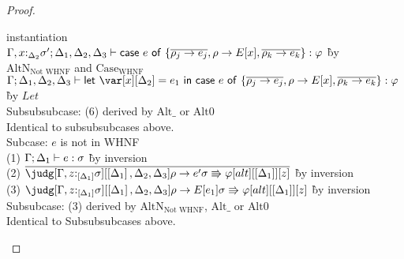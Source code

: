\begin{proof}
\begin{tabbing}
       instantiation\\
         $\Gamma,x{:}_{\Delta_2}\sigma'; \Delta_1,\Delta_2,\Delta_3 \vdash \mathsf{case}~e~\mathsf{of}~\{\overline{\rho_j\to e_j}, \rho \to
  E[x], \overline{\rho_k\to e_k}\} : \varphi$ \` by $\textrm{AltN}_{\textrm{Not
           WHNF}}$ and
       $\textrm{Case}_\textrm{WHNF}$\\
         $\G ; \D_1 , \D_2 , \D_3 \vdash \llet{\x[\D_2] = e_1}{\ccase{e}{\{\overline{\rho_j\to e_j}, \rho \to
           E[x], \overline{\rho_k\to e_k}\}}} : \vp$ \` by
       $\mathit{Let}$\\
       Subsubsubcase: (6) derived by $\textrm{Alt}\_$ or
       $\textrm{Alt}0$\\
       Identical to subsubsubcases above.\\
       Subcase: $e$ is not in WHNF\\
       (1) $\Gamma ; \Delta_1 \vdash e : \sigma$ \` by inversion\\
       (2) $\ov{\judg[\G,z{:}_{\irr{\D_1}}\s][\irr{\D_1},\D_2,\D_3]{\rho\to
           e'}{\s \Rrightarrow \vp}[alt][\irr{\D_1}][z]}$ \` by
       inversion\\
       (3) $\judg[\G,z{:}_{\irr{\D_1}}\s][\irr{\D_1},\D_2,\D_3]{\rho\to
           E[e_1]}{\s \Rrightarrow \vp}[alt][\irr{\D_1}][z]$ \` by
         inversion\\
       Subsubcase: (3) derived by $\textrm{AltN}_{\textrm{Not
           WHNF}}$, $\textrm{Alt}\_$ or
       $\textrm{Alt}0$\\
       Identical to Subsubsubcases above.
     \end{tabbing}

   \end{proof}
